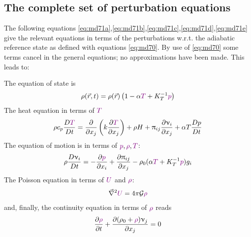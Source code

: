 \vspace{0.5cm}




\subsection{The complete set of perturbation equations}

The following equations \eqref{eq:md71a},\eqref{eq:md71b},\eqref{eq:md71c},\eqref{eq:md71d},\eqref{eq:md71e} 
give the relevant equations in terms of the perturbations w.r.t. the
adiabatic reference state as defined with equations \eqref{eq:md70}. By use of \eqref{eq:md70} 
some terms cancel in the general equations; no approximations have been made. This leads to:

The equation of state is
\begin{equation}
\rho(\vec{r},t) = \rho(\vec{r}) \left(1-\alpha {\color{violet} T} + K_T^{-1} {\color{violet}p} \right) 
\label{eq:md71a}
\end{equation}
The heat equation in terms of ${\color{violet}T}$
\begin{equation}
\rho c_p \frac{D {\color{violet} T}}{Dt} = \frac{\partial }{\partial x_j} 
\left( k \frac{\partial {\color{violet}T}}{\partial x_j}  \right)
+ \rho H + \uppi_{ij}\frac{\partial \upnu_i}{\partial x_j} + \alpha T \frac{Dp}{Dt}
\label{eq:md71b}
\end{equation}
The equation of motion is in terms of ${\color{violet}p},{\color{violet}\rho},{\color{violet}T}$:
\begin{equation}
\rho \frac{D \upnu_i}{Dt} = -\frac{\partial {\color{violet}p}}{\partial x_i}
+\frac{\partial \uppi_{ij}}{\partial x_j}
-\rho_0 (\alpha {\color{violet} T} + K_T^{-1} {\color{violet}p}) g_i
\label{eq:md71c}
\end{equation}
The Poisson equation in terms of ${\color{violet}U}$ and ${\color{violet}\rho}$:
\begin{equation}
\vec\nabla^2 {\color{violet} U} = 4 \pi {\cal G} {\color{violet} \rho}
\label{eq:md71d}
\end{equation}
and, finally, the continuity equation in terms of ${\color{violet}\rho}$ reads
\begin{equation}
\frac{\partial {\color{violet}\rho} }{\partial t} + 
\frac{\partial (\rho_0 + {\color{violet}\rho}) \upnu_j }{\partial x_j} =0
\label{eq:md71e}
\end{equation}



